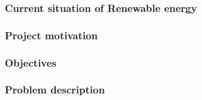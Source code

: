 \subsubsection*{\fontsize{12}{14} Current situation of Renewable energy}


\subsubsection*{\fontsize{12}{14} Project motivation}


\subsubsection*{\fontsize{12}{14} Objectives}


\subsubsection*{\fontsize{12}{14} Problem description}
\cite{ref7}
\cite{ref8}
\cite{ref9}
\cite{ref10}\cite{ref12}\cite{ref13}\cite{ref14}\cite{ref15}\cite{ref16}\cite{ref17}\cite{ref18}\cite{ref19}\cite{ref20}\cite{ref21}\cite{ref22}\cite{ref23}\cite{ref24}\cite{ref25}\cite{ref26}\cite{ref27}\cite{ref28}
\clearpage

